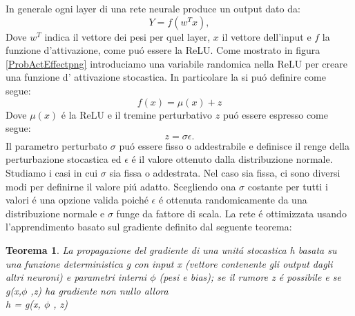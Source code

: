 \documentclass[a4paper,10pt]{article}
\begin{document}
 In generale ogni layer di una rete neurale produce un output dato da:
 \begin{equation} 
  Y = f\left(w^{T} x\right), 
 \end{equation} 
 Dove $w^{T}$ indica il vettore dei pesi per quel layer, $x$ il vettore dell'input e $f$ la funzione d'attivazione, come pu\'o  essere la ReLU. Come mostrato in figura \ref{ProbActEffectpng} introduciamo una variabile randomica nella ReLU per creare una funzione d' attivazione stocastica. In particolare la si pu\'o definire come segue:
 \begin{equation} 
  f\left(x\right) = \mu \left(x\right) + z
 \end{equation} 
 Dove $\mu\left(x\right)$ \'e la ReLU e il tremine perturbativo $z$ pu\'o essere espresso come segue:
 \begin{equation} 
  z = \sigma  \epsilon. 
 \end{equation} 
 Il parametro perturbato $\sigma$ pu\' o essere fisso o addestrabile e definisce il renge della perturbazione stocastica ed $\epsilon$ \'e il valore ottenuto dalla distribuzione normale. Studiamo i casi in cui $\sigma$ sia fissa o addestrata. 
 Nel caso sia fissa, ci sono diversi modi per definirne il valore pi\'u adatto. Scegliendo ona $\sigma$ costante per tutti i valori \'e una opzione valida poich\'e $\epsilon$ \'e ottenuta randomicamente da una distribuzione normale e $\sigma$ funge da fattore di scala. La rete \'e ottimizzata usando l'apprendimento basato sul gradiente definito dal seguente teorema:
 \newtheorem{teorema}{Teorema}
 
 \begin{teorema} \label{GradienPropth}
  La propagazione del gradiente di una unit\'a stocastica h basata su una funzione deterministica g con input x (vettore contenente gli output dagli altri neuroni) e parametri interni $\phi$ (pesi e bias); se il rumore z \'e possibile e se g(x,$\phi$ ,z) ha gradiente non nullo allora\\
  
  \centering
  h = g(x, $\phi$ , z)
 \end{teorema}
\end{document}
